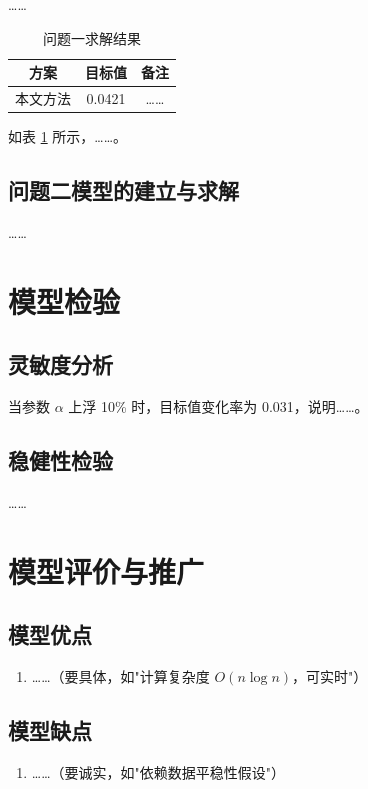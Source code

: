 \documentclass[UTF8,12pt,fontset=windows]{ctexart}
\begin{document}
……

\begin{table}[H]
  \centering
  \caption{问题一求解结果}
  \label{tab:q1-result}
  \begin{tabular}{ccc}
    \toprule
    方案 & 目标值 & 备注 \\
    \midrule
    本文方法 & 0.0421 & …… \\
    \bottomrule
  \end{tabular}
\end{table}

如表 \ref{tab:q1-result} 所示，……。

\subsection{问题二模型的建立与求解}

……

\section{模型检验}

\subsection{灵敏度分析}
当参数 $\alpha$ 上浮 10\% 时，目标值变化率为 0.031，说明……。%

\subsection{稳健性检验}
……

\section{模型评价与推广}

\subsection{模型优点}
\begin{enumerate}
  \item ……（要具体，如"计算复杂度 $O(n\log n)$，可实时"）
\end{enumerate}

\subsection{模型缺点}
\begin{enumerate}
  \item ……（要诚实，如"依赖数据平稳性假设"）
\end{enumerate}
\end{document}
